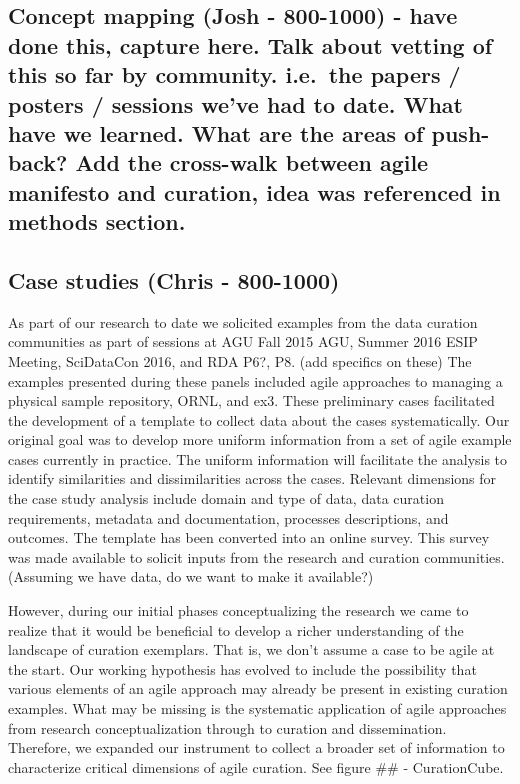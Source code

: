 \documentclass[paper]{ijdc-v9}
\begin{document}
\subsection{Concept mapping (Josh - 800-1000) - have done this, capture
here. Talk about vetting of this so far by community. i.e.~the papers /
posters / sessions we've had to date. What have we learned. What are the
areas of push-back? Add the cross-walk between agile manifesto and
curation, idea was referenced in methods
section.}\label{concept-mapping-josh---800-1000---have-done-this-capture-here.-talk-about-vetting-of-this-so-far-by-community.-i.e.the-papers-posters-sessions-weve-had-to-date.-what-have-we-learned.-what-are-the-areas-of-push-back-add-the-cross-walk-between-agile-manifesto-and-curation-idea-was-referenced-in-methods-section.}

\subsection{Case studies (Chris -
800-1000)}\label{case-studies-chris---800-1000}

As part of our research to date we solicited examples from the data
curation communities as part of sessions at AGU Fall 2015 AGU, Summer
2016 ESIP Meeting, SciDataCon 2016, and RDA P6?, P8. (add specifics on
these) The examples presented during these panels included agile
approaches to managing a physical sample repository, ORNL, and ex3.
These preliminary cases facilitated the development of a template to
collect data about the cases systematically. Our original goal was to
develop more uniform information from a set of agile example cases
currently in practice. The uniform information will facilitate the
analysis to identify similarities and dissimilarities across the cases.
Relevant dimensions for the case study analysis include domain and type
of data, data curation requirements, metadata and documentation,
processes descriptions, and outcomes. The template has been converted
into an online survey. This survey was made available to solicit inputs
from the research and curation communities. (Assuming we have data, do
we want to make it available?)

However, during our initial phases conceptualizing the research we came
to realize that it would be beneficial to develop a richer understanding
of the landscape of curation exemplars. That is, we don't assume a case
to be agile at the start. Our working hypothesis has evolved to include
the possibility that various elements of an agile approach may already
be present in existing curation examples. What may be missing is the
systematic application of agile approaches from research
conceptualization through to curation and dissemination. Therefore, we
expanded our instrument to collect a broader set of information to
characterize critical dimensions of agile curation. See figure \#\# -
CurationCube.
\end{document}
